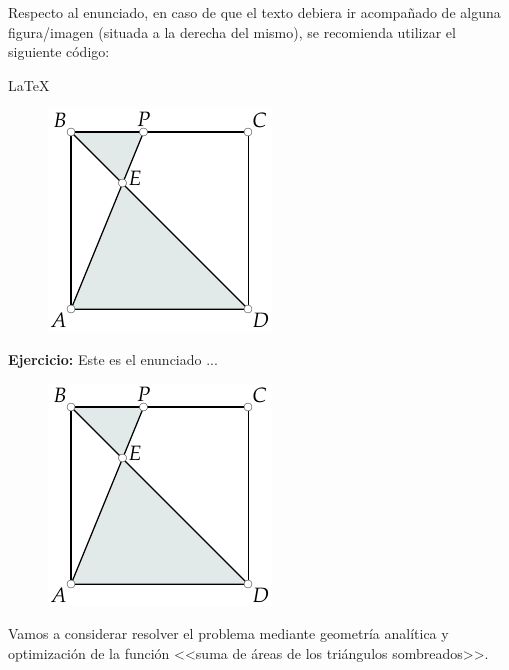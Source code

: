 \documentclass[
	fecha={5 de agosto de 2025},
	palabrasclave={RetoSecundaria, ago2025, álgebra, dif1},
	codigo=minted
]{RetoMatematico}
\begin{document}
\maketitle
\thispagestyle{empty}


Respecto al enunciado, en caso de que el texto debiera ir acompañado de alguna figura/imagen (situada a la derecha del mismo), se recomienda utilizar el siguiente código:
\begin{codigo}{LaTeX}
\begin{cajaejercicio}
	\begin{figure}
        \centering
		\includegraphics[scale=1]{imagenes/ejemplo-pstricks.pdf}
	\end{figure}
    \textbf{Ejercicio:} Este es el enunciado ...
\end{cajaejercicio}

\end{codigo}


\forma

\lipsum[1-2]

\begin{figure}
	\vspace{-4.5mm}
	\centering
	\includegraphics[scale=1]{imagenes/ejemplo-pstricks.pdf}
	\caption{}\label{fig:jmsm1}	
\end{figure}
Vamos a considerar resolver el problema mediante geometría analítica y optimización de la función <<suma de áreas de los triángulos sombreados>>.
\end{document}
